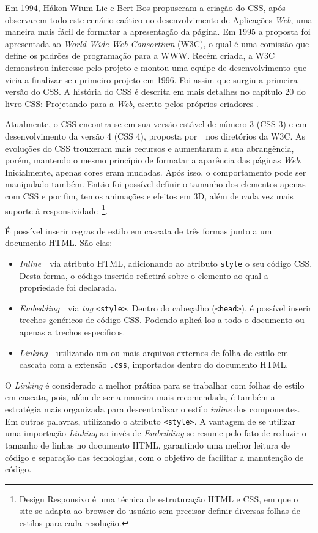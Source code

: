 Em 1994, Håkon Wium Lie e Bert Bos propuseram a criação do CSS, após observarem todo este cenário caótico no desenvolvimento de Aplicações \textit{Web}, uma maneira mais fácil de formatar a apresentação da página. Em 1995 a proposta foi apresentada ao \textit{World Wide Web Consortium} (W3C), o qual é uma comissão que define os padrões de programação para a WWW. Recém criada, a W3C demonstrou interesse pelo projeto e montou uma equipe de desenvolvimento que viria a finalizar seu primeiro projeto em 1996. Foi assim que surgiu a primeira versão do CSS. A história do CSS é descrita em mais detalhes no capítulo 20 do livro CSS: Projetando para a \textit{Web}, escrito pelos próprios criadores .

Atualmente, o CSS encontra-se em sua versão estável de número 3 (CSS 3) e em desenvolvimento da versão 4 (CSS 4), proposta por~~nos diretórios da W3C. As evoluções do CSS trouxeram mais recursos e aumentaram a sua abrangência, porém, mantendo o mesmo princípio de formatar a aparência das páginas \textit{Web}. Inicialmente, apenas cores eram mudadas. Após isso, o comportamento pode ser manipulado também. Então foi possível definir o tamanho dos elementos apenas com CSS e por fim, temos animações e efeitos em 3D, além de cada vez mais suporte à responsividade~\footnote{Design Responsivo é uma técnica de estruturação HTML e CSS, em que o site se adapta ao browser do usuário sem precisar definir diversas folhas de estilos para cada resolução.}.

É possível inserir regras de estilo em cascata de três formas junto a um documento HTML. São elas:
\begin{itemize}
    \item \textit{Inline}~\textemdash~via atributo HTML, adicionando ao atributo \texttt{style} o seu código CSS. Desta forma, o código inserido refletirá sobre o elemento ao qual a propriedade foi declarada.
    \item \textit{Embedding}~\textemdash~via \textit{tag} \texttt{<style>}. Dentro do cabeçalho (\texttt{<head>}), é possível inserir trechos genéricos de código CSS. Podendo aplicá-los a todo o documento ou apenas a trechos específicos.
    \item \textit{Linking}~\textemdash~utilizando um ou mais arquivos externos de folha de estilo em cascata com a extensão \texttt{.css}, importados dentro do documento HTML.
\end{itemize}

O \textit{Linking} é considerado a melhor prática para se trabalhar com folhas de estilo em cascata, pois, além de ser a maneira mais recomendada, é também a estratégia mais organizada para descentralizar o estilo \textit{inline} dos componentes. Em outras palavras, utilizando o atributo \texttt{<style>}. A vantagem de se utilizar uma importação \textit{Linking} ao invés de \textit{Embedding} se resume pelo fato de reduzir o tamanho de linhas no documento HTML, garantindo uma melhor leitura de código e separação das tecnologias, com o objetivo de facilitar a manutenção de código.

